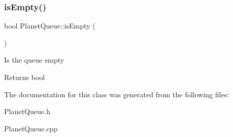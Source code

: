 \subsubsection{\texorpdfstring{is\+Empty()}{isEmpty()}}
{\footnotesize\ttfamily bool Planet\+Queue\+::is\+Empty (\begin{DoxyParamCaption}{ }\end{DoxyParamCaption})}

Is the queue empty \begin{DoxyReturn}{Returns}
bool 
\end{DoxyReturn}


The documentation for this class was generated from the following files\+:\begin{DoxyCompactItemize}
\item 
Planet\+Queue.\+h\item 
Planet\+Queue.\+cpp\end{DoxyCompactItemize}
